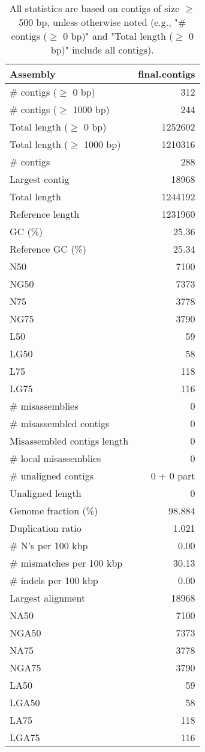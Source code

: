 \documentclass[12pt,a4paper]{article}
\begin{document}
\begin{table}[ht]
\begin{center}
\caption{All statistics are based on contigs of size $\geq$ 500 bp, unless otherwise noted (e.g., "\# contigs ($\geq$ 0 bp)" and "Total length ($\geq$ 0 bp)" include all contigs).}
\begin{tabular}{|l*{1}{|r}|}
\hline
Assembly & final.contigs \\ \hline
\# contigs ($\geq$ 0 bp) & 312 \\ \hline
\# contigs ($\geq$ 1000 bp) & 244 \\ \hline
Total length ($\geq$ 0 bp) & 1252602 \\ \hline
Total length ($\geq$ 1000 bp) & 1210316 \\ \hline
\# contigs & 288 \\ \hline
Largest contig & 18968 \\ \hline
Total length & 1244192 \\ \hline
Reference length & 1231960 \\ \hline
GC (\%) & 25.36 \\ \hline
Reference GC (\%) & 25.34 \\ \hline
N50 & 7100 \\ \hline
NG50 & 7373 \\ \hline
N75 & 3778 \\ \hline
NG75 & 3790 \\ \hline
L50 & 59 \\ \hline
LG50 & 58 \\ \hline
L75 & 118 \\ \hline
LG75 & 116 \\ \hline
\# misassemblies & 0 \\ \hline
\# misassembled contigs & 0 \\ \hline
Misassembled contigs length & 0 \\ \hline
\# local misassemblies & 0 \\ \hline
\# unaligned contigs & 0 + 0 part \\ \hline
Unaligned length & 0 \\ \hline
Genome fraction (\%) & 98.884 \\ \hline
Duplication ratio & 1.021 \\ \hline
\# N's per 100 kbp & 0.00 \\ \hline
\# mismatches per 100 kbp & 30.13 \\ \hline
\# indels per 100 kbp & 0.00 \\ \hline
Largest alignment & 18968 \\ \hline
NA50 & 7100 \\ \hline
NGA50 & 7373 \\ \hline
NA75 & 3778 \\ \hline
NGA75 & 3790 \\ \hline
LA50 & 59 \\ \hline
LGA50 & 58 \\ \hline
LA75 & 118 \\ \hline
LGA75 & 116 \\ \hline
\end{tabular}
\end{center}
\end{table}
\end{document}
